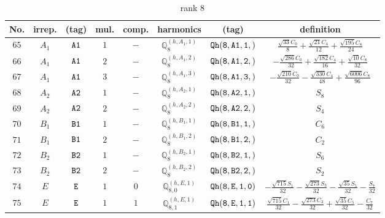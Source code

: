 \documentclass[fleqn,8pt]{jsarticle}
\begin{document}
\begin{table}[ht!]
\begin{center}
\caption{rank 8}
\renewcommand{\arraystretch}{1.3}
\begin{tabular}{cccccccc} \hline \hline
No. & irrep. & (tag) & mul. & comp. & harmonics & (tag) & definition \\ \hline
$ 65 $ & $ A_{1} $ & $ {\tt A1} $ & $ 1 $ & $ - $ & $ \mathbb{Q}_{8}^{(h,A_{1},1)} $ & $ {\tt Qh(8,A1,1,)} $ & $ \frac{\sqrt{33} C_{0}}{8} + \frac{\sqrt{21} C_{4}}{12} + \frac{\sqrt{195} C_{8}}{24} $ \\
$ 66 $ & $ A_{1} $ & $ {\tt A1} $ & $ 2 $ & $ - $ & $ \mathbb{Q}_{8}^{(h,A_{1},2)} $ & $ {\tt Qh(8,A1,2,)} $ & $ - \frac{\sqrt{286} C_{0}}{32} + \frac{\sqrt{182} C_{4}}{16} + \frac{\sqrt{10} C_{8}}{32} $ \\
$ 67 $ & $ A_{1} $ & $ {\tt A1} $ & $ 3 $ & $ - $ & $ \mathbb{Q}_{8}^{(h,A_{1},3)} $ & $ {\tt Qh(8,A1,3,)} $ & $ - \frac{\sqrt{210} C_{0}}{32} - \frac{\sqrt{330} C_{4}}{48} + \frac{\sqrt{6006} C_{8}}{96} $ \\
$ 68 $ & $ A_{2} $ & $ {\tt A2} $ & $ 1 $ & $ - $ & $ \mathbb{Q}_{8}^{(h,A_{2},1)} $ & $ {\tt Qh(8,A2,1,)} $ & $ S_{8} $ \\
$ 69 $ & $ A_{2} $ & $ {\tt A2} $ & $ 2 $ & $ - $ & $ \mathbb{Q}_{8}^{(h,A_{2},2)} $ & $ {\tt Qh(8,A2,2,)} $ & $ S_{4} $ \\
$ 70 $ & $ B_{1} $ & $ {\tt B1} $ & $ 1 $ & $ - $ & $ \mathbb{Q}_{8}^{(h,B_{1},1)} $ & $ {\tt Qh(8,B1,1,)} $ & $ C_{6} $ \\
$ 71 $ & $ B_{1} $ & $ {\tt B1} $ & $ 2 $ & $ - $ & $ \mathbb{Q}_{8}^{(h,B_{1},2)} $ & $ {\tt Qh(8,B1,2,)} $ & $ C_{2} $ \\
$ 72 $ & $ B_{2} $ & $ {\tt B2} $ & $ 1 $ & $ - $ & $ \mathbb{Q}_{8}^{(h,B_{2},1)} $ & $ {\tt Qh(8,B2,1,)} $ & $ S_{6} $ \\
$ 73 $ & $ B_{2} $ & $ {\tt B2} $ & $ 2 $ & $ - $ & $ \mathbb{Q}_{8}^{(h,B_{2},2)} $ & $ {\tt Qh(8,B2,2,)} $ & $ S_{2} $ \\
$ 74 $ & $ E $ & $ {\tt E} $ & $ 1 $ & $ 0 $ & $ \mathbb{Q}_{8,0}^{(h,E,1)} $ & $ {\tt Qh(8,E,1,0)} $ & $ - \frac{\sqrt{715} S_{1}}{32} - \frac{\sqrt{273} S_{3}}{32} - \frac{\sqrt{35} S_{5}}{32} - \frac{S_{7}}{32} $ \\
$ 75 $ & $ E $ & $ {\tt E} $ & $ 1 $ & $ 1 $ & $ \mathbb{Q}_{8,1}^{(h,E,1)} $ & $ {\tt Qh(8,E,1,1)} $ & $ \frac{\sqrt{715} C_{1}}{32} - \frac{\sqrt{273} C_{3}}{32} + \frac{\sqrt{35} C_{5}}{32} - \frac{C_{7}}{32} $ \\

\end{tabular}
\end{center}
\end{table}
\end{document}
